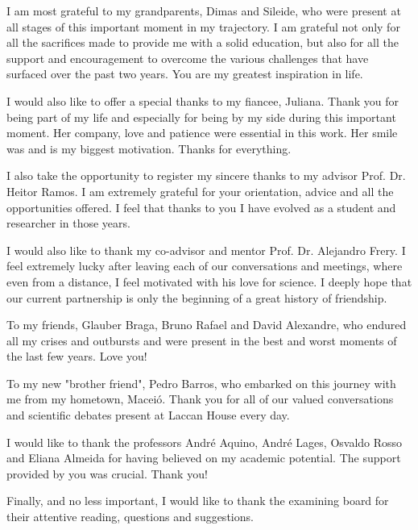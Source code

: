 I am most grateful to my grandparents, Dimas and Sileide, who were present at all stages of this important moment in my trajectory.
I am grateful not only for all the sacrifices made to provide me with a solid education, but also for all the support and encouragement to overcome the various challenges that have surfaced over the past two years.
You are my greatest inspiration in life.

I would also like to offer a special thanks to my fiancee, Juliana.
Thank you for being part of my life and especially for being by my side during this important moment.
Her company, love and patience were essential in this work.
Her smile was and is my biggest motivation.
Thanks for everything.

I also take the opportunity to register my sincere thanks to my advisor Prof. Dr. Heitor Ramos.
I am extremely grateful for your orientation, advice and all the opportunities offered.
I feel that thanks to you I have evolved as a student and researcher in those years.

I would also like to thank my co-advisor and mentor Prof. Dr. Alejandro Frery.
I feel extremely lucky after leaving each of our conversations and meetings, where even from a distance, I feel motivated with his love for science.
I deeply hope that our current partnership is only the beginning of a great history of friendship.

To my friends, Glauber Braga, Bruno Rafael and David Alexandre, who endured all my crises and outbursts and were present in the best and worst moments of the last few years.
Love you!

To my new "brother friend", Pedro Barros, who embarked on this journey with me from my hometown, Maceió.
Thank you for all of our valued conversations and scientific debates present at Laccan House every day.

I would like to thank the professors André Aquino, André Lages, Osvaldo Rosso and Eliana Almeida for having believed on my academic potential.
The support provided by you was crucial.
Thank you!

Finally, and no less important, I would like to thank the examining board for their attentive reading, questions and suggestions.